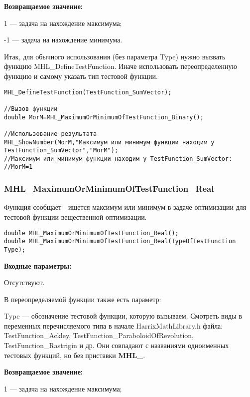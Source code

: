 \documentclass[a4paper,12pt]{article}
\begin{document}
\textbf{Возвращаемое значение:}
 
1 --- задача на нахождение максимума;

-1 --- задача на нахождение минимума.

Итак, для обычного использования (без параметра Type) нужно вызвать функцию MHL\_DefineTestFunction. Иначе использовать переопределенную функцию и самому указать тип тестовой функции.


\begin{lstlisting}[label=code_use_MHL_MaximumOrMinimumOfTestFunction_Binary,caption=Пример использования]
MHL_DefineTestFunction(TestFunction_SumVector);

//Вызов функции
double MorM=MHL_MaximumOrMinimumOfTestFunction_Binary();

//Использование результата
MHL_ShowNumber(MorM,"Максимум или минимум функции находим у TestFunction_SumVector","MorM");
//Максимум или минимум функции находим у TestFunction_SumVector:
//MorM=1
\end{lstlisting}

\subsubsection{MHL\_MaximumOrMinimumOfTestFunction\_Real}\label{MHL_MaximumOrMinimumOfTestFunction_Real}

	Функция сообщает - ищется максимум или минимум в задаче оптимизации для тестовой функции вещественной оптимизации.


\begin{lstlisting}[label=code_syntax_MHL_MaximumOrMinimumOfTestFunction_Real,caption=Синтаксис]
double MHL_MaximumOrMinimumOfTestFunction_Real();
double MHL_MaximumOrMinimumOfTestFunction_Real(TypeOfTestFunction Type);
\end{lstlisting}

\textbf{Входные параметры:}

Отсутствуют.

В переопределяемой функции также есть параметр:
  
Type --- обозначение тестовой функции, которую вызываем.
Смотреть виды в переменных перечисляемого типа в начале HarrixMathLibrary.h файла: TestFunction\_Ackley, TestFunction\_ParaboloidOfRevolution, TestFunction\_Rastrigin и др. Они совпадают с названиями одноименных тестовых функций, но без приставки \textbf{MHL\_}.

\textbf{Возвращаемое значение:}
 
1 --- задача на нахождение максимума;
\end{document}
